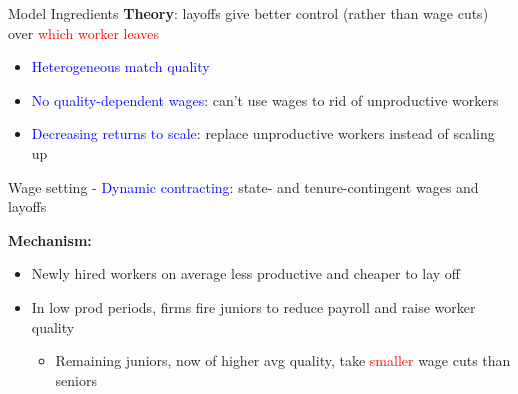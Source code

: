 \documentclass[9pt,aspectratio=169]{beamer} %
\begin{document}
\begin{frame}{Model Ingredients} %
\textbf{Theory}: layoffs give better control (rather than wage cuts)  over \textcolor{red}{which worker leaves}
\begin{itemize}
    \item \textcolor{blue}{Heterogeneous match quality}
\vspace{5pt}    
    \item \textcolor{blue}{No quality-dependent wages}: can't use wages to rid of unproductive workers
\vspace{5pt}
    \item \textcolor{blue}{Decreasing returns to scale}: replace unproductive workers instead of scaling up
\end{itemize}
\vspace{5pt}
Wage setting - \textcolor{blue}{Dynamic contracting}: state- and tenure-contingent wages and layoffs

\vspace{15pt}
    \textbf{Mechanism:}
\begin{itemize}
    \item Newly hired workers on average less productive and cheaper to lay off
    \item In low prod periods, firms fire juniors to reduce payroll and raise worker quality
        \begin{itemize}
            \item Remaining juniors, now of higher avg quality, take \textcolor{red}{smaller} wage cuts than seniors
        \end{itemize}
\end{itemize}
\end{frame}
\end{document}
